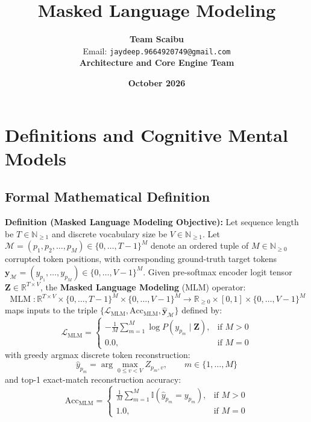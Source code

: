 \documentclass[11pt,a4paper]{article}
\title{\textbf{Masked Language Modeling}}
\author{\textbf{Team Scaibu} \\ \small Email: \texttt{jaydeep.9664920749@gmail.com} \\ \small \textbf{Architecture and Core Engine Team}}
\date{\textbf{October 2026}}
\theoremstyle{definition}
\begin{document}
\maketitle

\section{Definitions and Cognitive Mental Models}

\subsection{Formal Mathematical Definition}
\textbf{Definition (Masked Language Modeling Objective):}
Let sequence length be $T \in \mathbb{N}_{\ge 1}$ and discrete vocabulary size be $V \in \mathbb{N}_{\ge 1}$. Let $\mathcal{M} = (p_1, p_2, \dots, p_M) \in \{0, \dots, T-1\}^M$ denote an ordered tuple of $M \in \mathbb{N}_{\ge 0}$ corrupted token positions, with corresponding ground-truth target tokens $\mathbf{y}_{\mathcal{M}} = (y_{p_1}, \dots, y_{p_M}) \in \{0, \dots, V-1\}^M$.
Given pre-softmax encoder logit tensor $\mathbf{Z} \in \mathbb{R}^{T \times V}$, the \textbf{Masked Language Modeling} (MLM) operator:
{\boldmath
\begin{equation}
\operatorname{MLM}: \mathbb{R}^{T \times V} \times \{0, \dots, T-1\}^M \times \{0, \dots, V-1\}^M \longrightarrow \mathbb{R}_{\ge 0} \times [0, 1] \times \{0, \dots, V-1\}^M
\end{equation}
}
maps inputs to the triple $\{\mathcal{L}_{\text{MLM}}, \text{Acc}_{\text{MLM}}, \hat{\mathbf{y}}_{\mathcal{M}}\}$ defined by:
{\boldmath
\begin{equation}
\mathcal{L}_{\text{MLM}} = \begin{cases} -\frac{1}{M} \sum_{m=1}^M \log P(y_{p_m} \mid \mathbf{Z}), & \text{if } M > 0 \\ 0.0, & \text{if } M = 0 \end{cases}
\end{equation}
}
with greedy argmax discrete token reconstruction:
{\boldmath
\begin{equation}
\hat{y}_{p_m} = \arg\max_{0 \le v < V} Z_{p_m, v}, \qquad m \in \{1, \dots, M\}
\end{equation}
}
and top-1 exact-match reconstruction accuracy:
{\boldmath
\begin{equation}
\text{Acc}_{\text{MLM}} = \begin{cases} \frac{1}{M} \sum_{m=1}^M \mathbb{I}(\hat{y}_{p_m} = y_{p_m}), & \text{if } M > 0 \\ 1.0, & \text{if } M = 0 \end{cases}
\end{equation}
}
\end{document}
